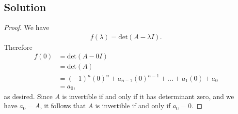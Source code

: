 \documentclass[10pt,a4paper]{article}
\theoremstyle{definition}
\begin{document}
\subsection*{Solution}
\begin{proof}
We have
\begin{align*}
f(\lambda) = \text{det} (A - \lambda I).
\end{align*}
Therefore
\begin{align*}
f(0) &= \text{det} (A - 0I)\\
&= \text{det} (A)\\
&= (-1)^n (0)^n + a_{n-1} (0)^{n-1} + \dots + a_1 (0) + a_0\\
&= a_0,
\end{align*}
as desired. Since $A$ is invertible if and only if it has determinant zero, and we have $a_0 = A$, it follows that $A$ is invertible if and only if $a_0 = 0$.
\end{proof}
\end{document}
